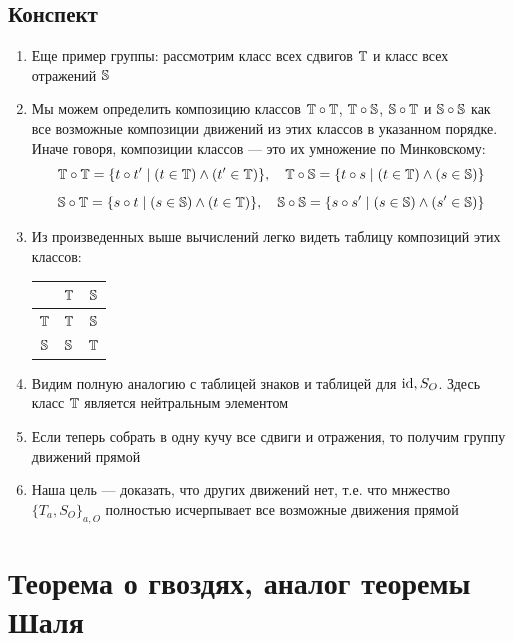 \subsection{Конспект}
\begin{enumerate}\setlength{\itemsep}{1pt}
\item Еще пример группы: рассмотрим класс всех сдвигов $\T$ и класс всех отражений $\S$
\item Мы можем определить композицию классов $\T\circ \T$, $\T\circ \S$, $\S\circ \T$ и $\S\circ \S$ как все возможные композиции движений из этих классов в указанном порядке. Иначе говоря, композиции классов --- это их умножение по Минковскому:
$$
\T\circ \T = \{t\circ t'\mid (t\in\T)\land(t'\in\T)\},\quad \T\circ \S = \{t\circ s\mid (t\in\T)\land(s\in\S)\}
$$
$$
\S\circ \T = \{s\circ t\mid (s\in\S)\land(t\in\T)\},\quad \S\circ \S = \{s\circ s'\mid (s\in\S)\land(s'\in\S)\}
$$
\item Из произведенных выше вычислений легко видеть таблицу композиций этих классов:
\begin{table}[htb!]\begin{center}
\begin{tabular}{c|c|c|}
  & $\T$ & $\S$ \\
 \hline
$\T$ & $\T$ & $\S$ \\
 \hline
$\S$ & $\S$ & $\T$ \\
\hline
\end{tabular}
\end{center}\end{table}
\item Видим полную аналогию с таблицей знаков и таблицей для $\id, S_O$. Здесь класс $\T$ является нейтральным элементом
\item Если теперь собрать в одну кучу все сдвиги и отражения, то получим группу движений прямой
\item Наша цель --- доказать, что других движений нет, т.е. что мнжество $\{T_a,S_O\}_{a,O}$ полностью исчерпывает все возможные движения прямой
\end{enumerate}



\section{Теорема о гвоздях, аналог теоремы Шаля}

